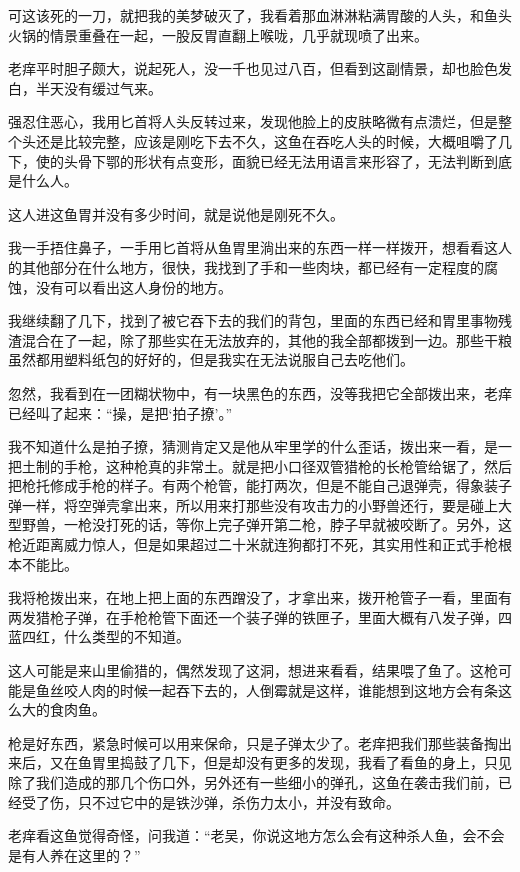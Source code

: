 可这该死的一刀，就把我的美梦破灭了，我看着那血淋淋粘满胃酸的人头，和鱼头火锅的情景重叠在一起，一股反胃直翻上喉咙，几乎就现喷了出来。

老痒平时胆子颇大，说起死人，没一千也见过八百，但看到这副情景，却也脸色发白，半天没有缓过气来。

强忍住恶心，我用匕首将人头反转过来，发现他脸上的皮肤略微有点溃烂，但是整个头还是比较完整，应该是刚吃下去不久，这鱼在吞吃人头的时候，大概咀嚼了几下，使的头骨下鄂的形状有点变形，面貌已经无法用语言来形容了，无法判断到底是什么人。

这人进这鱼胃并没有多少时间，就是说他是刚死不久。

我一手捂住鼻子，一手用匕首将从鱼胃里淌出来的东西一样一样拨开，想看看这人的其他部分在什么地方，很快，我找到了手和一些肉块，都已经有一定程度的腐蚀，没有可以看出这人身份的地方。

我继续翻了几下，找到了被它吞下去的我们的背包，里面的东西已经和胃里事物残渣混合在了一起，除了那些实在无法放弃的，其他的我全部都拨到一边。那些干粮虽然都用塑料纸包的好好的，但是我实在无法说服自己去吃他们。

忽然，我看到在一团糊状物中，有一块黑色的东西，没等我把它全部拨出来，老痒已经叫了起来：“操，是把‘拍子撩’。”

我不知道什么是拍子撩，猜测肯定又是他从牢里学的什么歪话，拨出来一看，是一把土制的手枪，这种枪真的非常土。就是把小口径双管猎枪的长枪管给锯了，然后把枪托修成手枪的样子。有两个枪管，能打两次，但是不能自己退弹壳，得象装子弹一样，将空弹壳拿出来，所以用来打那些没有攻击力的小野兽还行，要是碰上大型野兽，一枪没打死的话，等你上完子弹开第二枪，脖子早就被咬断了。另外，这枪近距离威力惊人，但是如果超过二十米就连狗都打不死，其实用性和正式手枪根本不能比。

我将枪拨出来，在地上把上面的东西蹭没了，才拿出来，拨开枪管子一看，里面有两发猎枪子弹，在手枪枪管下面还一个装子弹的铁匣子，里面大概有八发子弹，四蓝四红，什么类型的不知道。

这人可能是来山里偷猎的，偶然发现了这洞，想进来看看，结果喂了鱼了。这枪可能是鱼丝咬人肉的时候一起吞下去的，人倒霉就是这样，谁能想到这地方会有条这么大的食肉鱼。

枪是好东西，紧急时候可以用来保命，只是子弹太少了。老痒把我们那些装备掏出来后，又在鱼胃里捣鼓了几下，但是却没有更多的发现，我看了看鱼的身上，只见除了我们造成的那几个伤口外，另外还有一些细小的弹孔，这鱼在袭击我们前，已经受了伤，只不过它中的是铁沙弹，杀伤力太小，并没有致命。

老痒看这鱼觉得奇怪，问我道：“老吴，你说这地方怎么会有这种杀人鱼，会不会是有人养在这里的？”

